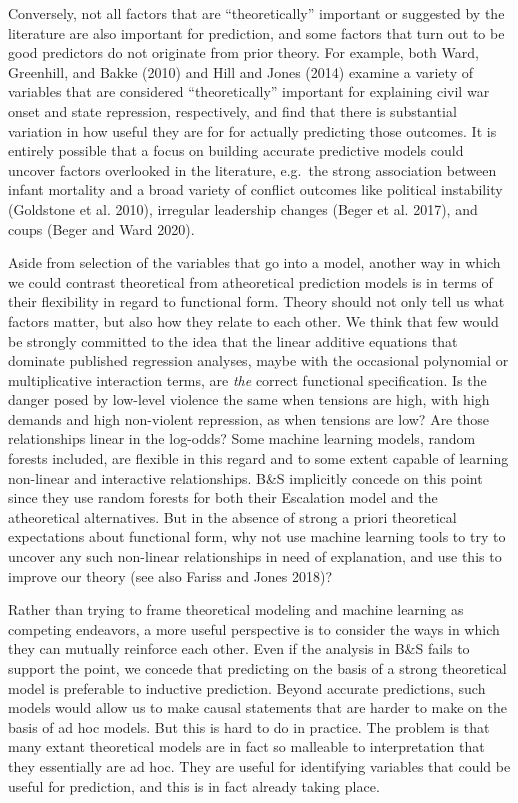 \documentclass[
]{article}
\begin{document}
Conversely, not all factors that are ``theoretically'' important or suggested by the literature are also important for prediction, and some factors that turn out to be good predictors do not originate from prior theory. For example, both Ward, Greenhill, and Bakke (2010) and Hill and Jones (2014) examine a variety of variables that are considered ``theoretically'' important for explaining civil war onset and state repression, respectively, and find that there is substantial variation in how useful they are for for actually predicting those outcomes. It is entirely possible that a focus on building accurate predictive models could uncover factors overlooked in the literature, e.g.~the strong association between infant mortality and a broad variety of conflict outcomes like political instability (Goldstone et al. 2010), irregular leadership changes (Beger et al. 2017), and coups (Beger and Ward 2020).

Aside from selection of the variables that go into a model, another way in which we could contrast theoretical from atheoretical prediction models is in terms of their flexibility in regard to functional form. Theory should not only tell us what factors matter, but also how they relate to each other. We think that few would be strongly committed to the idea that the linear additive equations that dominate published regression analyses, maybe with the occasional polynomial or multiplicative interaction terms, are \emph{the} correct functional specification. Is the danger posed by low-level violence the same when tensions are high, with high demands and high non-violent repression, as when tensions are low? Are those relationships linear in the log-odds? Some machine learning models, random forests included, are flexible in this regard and to some extent capable of learning non-linear and interactive relationships. B\&S implicitly concede on this point since they use random forests for both their Escalation model and the atheoretical alternatives. But in the absence of strong a priori theoretical expectations about functional form, why not use machine learning tools to try to uncover any such non-linear relationships in need of explanation, and use this to improve our theory (see also Fariss and Jones 2018)?

Rather than trying to frame theoretical modeling and machine learning as competing endeavors, a more useful perspective is to consider the ways in which they can mutually reinforce each other. Even if the analysis in B\&S fails to support the point, we concede that predicting on the basis of a strong theoretical model is preferable to inductive prediction. Beyond accurate predictions, such models would allow us to make causal statements that are harder to make on the basis of ad hoc models. But this is hard to do in practice. The problem is that many extant theoretical models are in fact so malleable to interpretation that they essentially are ad hoc. They are useful for identifying variables that could be useful for prediction, and this is in fact already taking place.
\end{document}
